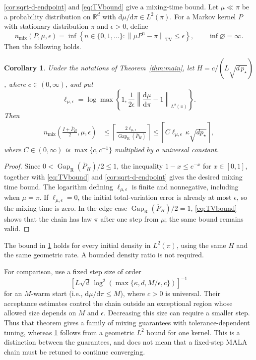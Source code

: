 \documentclass[11pt]{article}
\newtheorem{corollary}[corollary]{Corollary}
\newcommand{\R}{\mathbb R}
\newcommand{\Gap}{\operatorname{Gap}_{\mathrm{R}}}
\newcommand{\norm}[1]{\left\lVert #1\right\rVert}
\newcommand{\1}{\mathbf 1}
\newcommand{\df}{\mathrm{d}}
\begin{document}
	
	\cref{cor:sqrt-d-endpoint} and \eqref{eq:TVbound} give a mixing-time bound.
	Let \(\mu\ll\pi\) be a probability distribution on \(\R^d\) with
	\(\df\mu/\df\pi\in L^2(\pi)\). For a Markov kernel \(P\) with
	stationary distribution \(\pi\) and \(\epsilon>0\), define
	\[
	n_{\mathrm{mix}}(P,\mu,\epsilon)
	=\inf\left\{n\in\{0,1,\ldots\}:
	\norm{\mu P^n-\pi}_{\mathrm{TV}}\leq\epsilon\right\},
	\qquad \inf\varnothing=\infty.
	\]
	Then the following holds.
	
	\begin{corollary} \label{cor:mixing}
		Under the notations of Theorem~\ref{thm:main}, let \(H=c/(L\sqrt{d\,p_\star})\), where \(c \in (0,\infty)\), and put
		\[
		\ell_{\mu,\epsilon}
		=\log\max\left\{1,
		\frac{1}{2\epsilon}
		\norm{\frac{\df\mu}{\df\pi}-1}_{L^2(\pi)}\right\}.
		\]
		Then
		\[
		\begin{aligned}
			n_{\mathrm{mix}}\left(\frac{I+\overline P_H}{2},\mu,\epsilon\right)
			&\leq
			\left\lceil\frac{2\ell_{\mu,\epsilon}}
			{\Gap(\overline P_H)}\right\rceil
			\leq
			\left\lceil
			C\ell_{\mu,\epsilon}\,\kappa\sqrt {d p_{\star} } \right\rceil,
		\end{aligned}
		\]
		where \(C \in (0,\infty)\) is $\max\{c,c^{-1}\}$ multiplied by a universal constant.
	\end{corollary}
	\begin{proof}
		Since \(0<\Gap(\overline P_H)/2\leq1\), the inequality
		\(1-x\leq e^{-x}\) for \(x\in[0,1]\), together with
		\eqref{eq:TVbound} and \cref{cor:sqrt-d-endpoint} gives the desired mixing time bound.
		The logarithm defining
		\(\ell_{\mu,\epsilon}\) is finite and nonnegative, including when
		\(\mu=\pi\). If \(\ell_{\mu,\epsilon}=0\), the initial total-variation
		error is already at most \(\epsilon\), so the mixing time is zero.
		In the edge case \(\Gap(\overline P_H)/2=1\),
		\eqref{eq:TVbound} shows that the chain has law \(\pi\) after one step
		from \(\mu\); the same bound remains valid.
	\end{proof}
	
	
	
	The bound in \cref{cor:mixing} holds for every initial density in
	$L^2(\pi)$, using the same $H$ and the same geometric rate. A bounded
	density ratio is not required. 
	
	For comparison, \citet[Theorem~1]{WuSchmidlerChen2022} use a fixed
	step size of order
	\[
	[L\sqrt d\,\log^2(\max\{\kappa,d,M/\epsilon,c\})]^{-1}
	\]
	for an $M$-warm start (i.e., $\df \mu/\df \pi \leq M$), where $c>0$ is universal. Their acceptance estimates
	control the chain outside an exceptional region whose allowed size
	depends on $M$ and $\epsilon$. Decreasing this size can require a
	smaller step. Thus that theorem gives a family of mixing guarantees
	with tolerance-dependent tuning, whereas \cref{cor:mixing} follows
	from a geometric $L^2$ bound for one kernel. This is a distinction
	between the guarantees, and does not mean that a fixed-step MALA chain
	must be retuned to continue converging.
	
\end{document}
